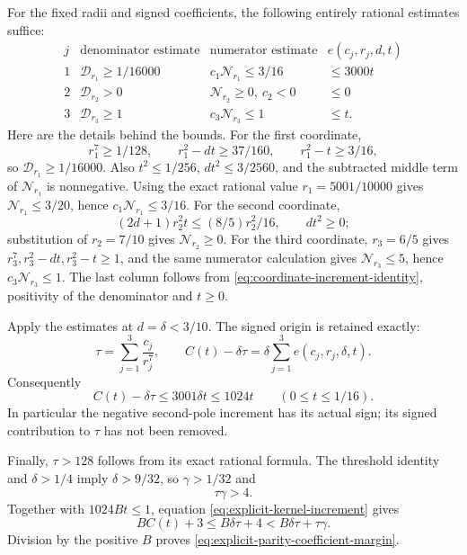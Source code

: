For the fixed radii and signed coefficients, the following entirely
rational estimates suffice:
\[
 \begin{array}{c|c|c|c}
 j&\text{denominator estimate}
   &\text{numerator estimate}&e(c_j,r_j,d,t)\\ \hline
 1&\mathcal D_{r_1}\ge1/16000
   &c_1\mathcal N_{r_1}\le3/16&\le3000t\\
 2&\mathcal D_{r_2}>0
   &\mathcal N_{r_2}\ge0,\ c_2<0&\le0\\
 3&\mathcal D_{r_3}\ge1
   &c_3\mathcal N_{r_3}\le1&\le t .
 \end{array}
\]
Here are the details behind the bounds.
For the first coordinate,
\[
 r_1^7\ge1/128,\qquad r_1^2-dt\ge37/160,\qquad
 r_1^2-t\ge3/16,
\]
so \(\mathcal D_{r_1}\ge1/16000\).
Also \(t^2\le1/256\), \(dt^2\le3/2560\), and the subtracted
middle term of \(\mathcal N_{r_1}\) is nonnegative.
Using the exact rational value \(r_1=5001/10000\) gives
\(\mathcal N_{r_1}\le3/20\), hence
\(c_1\mathcal N_{r_1}\le3/16\).
For the second coordinate,
\[
 (2d+1)r_2^2t\le(8/5)r_2^2/16,\qquad dt^2\ge0;
\]
substitution of \(r_2=7/10\) gives
\(\mathcal N_{r_2}\ge0\).
For the third coordinate, \(r_3=6/5\) gives
\(r_3^7,r_3^2-dt,r_3^2-t\ge1\), and the same
numerator calculation gives \(\mathcal N_{r_3}\le5\), hence
\(c_3\mathcal N_{r_3}\le1\).
The last column follows from
\eqref{eq:coordinate-increment-identity}, positivity of the
denominator and \(t\ge0\).

Apply the estimates at \(d=\delta<3/10\).
The signed origin is retained exactly:
\[
 \tau=\sum_{j=1}^3\frac{c_j}{r_j^7},\qquad
 C(t)-\delta\tau=\delta\sum_{j=1}^3e(c_j,r_j,\delta,t).
\]
Consequently
\begin{equation}
 C(t)-\delta\tau\le3001\delta t\le1024t
 \qquad(0\le t\le1/16).
 \label{eq:explicit-kernel-increment}
\end{equation}
In particular the negative second-pole increment has its actual
sign; its signed contribution to \(\tau\) has not been removed.

Finally, \(\tau>128\) follows from its exact rational formula.
The threshold identity and \(\delta>1/4\) imply
\(\delta>9/32\), so \(\gamma>1/32\) and
\[
 \tau\gamma>4.
\]
Together with \(1024Bt\le1\), equation
\eqref{eq:explicit-kernel-increment} gives
\[
 BC(t)+3\le B\delta\tau+4
 <B\delta\tau+\tau\gamma.
\]
Division by the positive \(B\) proves
\eqref{eq:explicit-parity-coefficient-margin}.

